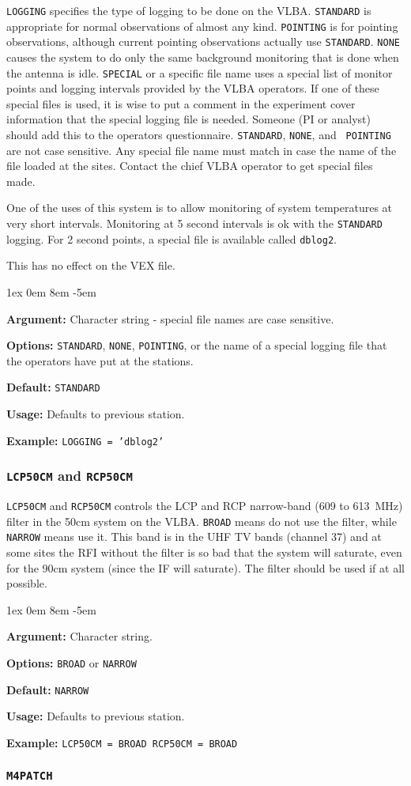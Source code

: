 \documentclass{report}
\newcommand{\rcwbox}[5]{
  \begin{list}{}{\parsep 1ex  \itemsep 0em
                 \leftmargin 8em  \itemindent -5em }
    \item {\bf Argument:} #1
    \item {\bf Options:}  #2
    \item {\bf Default:}  #3
    \item {\bf Usage:}    #4
    \item {\bf Example:}  #5
  \end{list}
}
\begin{document}
{\tt LOGGING} specifies the type of logging to be done on the
VLBA. {\tt STANDARD} is appropriate for normal observations of almost
any kind.  {\tt POINTING} is for pointing observations, although
current pointing observations actually use {\tt STANDARD}.  {\tt NONE}
causes the system to do only the same background monitoring that is
done when the antenna is idle.  {\tt SPECIAL} or a specific file name
uses a special list of monitor points and logging intervals provided
by the VLBA operators.  If one of these special files is used, it is
wise to put a comment in the experiment cover information that the
special logging file is needed.  Someone (PI or analyst) should add
this to the operators questionnaire. {\tt STANDARD}, {\tt NONE}, and {\tt
POINTING} are not case sensitive.  Any special file name must match
in case the name of the file loaded at the sites.  Contact the chief
VLBA operator to get special files made.

One of the uses of this system is to allow monitoring of system
temperatures at very short intervals.  Monitoring at 5 second intervals
is ok with the {\tt STANDARD} logging.  For 2 second points, a special
file is available called {\tt dblog2}.

This has no effect on the VEX file.

\rcwbox
{Character string - special file names are case sensitive.}
{{\tt STANDARD}, {\tt NONE}, {\tt POINTING}, or the name of a special
logging file that the operators have put at the stations.}
{{\tt STANDARD}}
{Defaults to previous station.}
{{\tt LOGGING = 'dblog2'}}


\subsubsection{\label{SP:LCP50CM}{\tt LCP50CM} and {\tt RCP50CM}}

{\tt LCP50CM} and {\tt RCP50CM} controls the LCP and RCP narrow-band
(609 to 613~MHz) filter in the 50cm system on the VLBA. {\tt BROAD}
means do not use the filter, while {\tt NARROW} means use it. This
band is in the UHF TV bands (channel 37) and at some sites the RFI
without the filter is so bad that the system will saturate, even for
the 90cm system (since the IF will saturate). The filter should be
used if at all possible.

\rcwbox
{Character string.}
{{\tt BROAD} or {\tt NARROW}}
{{\tt NARROW}}
{Defaults to previous station.}
{{\tt LCP50CM = BROAD  RCP50CM = BROAD}}


\subsubsection{\label{SP:M4PATCH}{\tt M4PATCH}}
\end{document}
